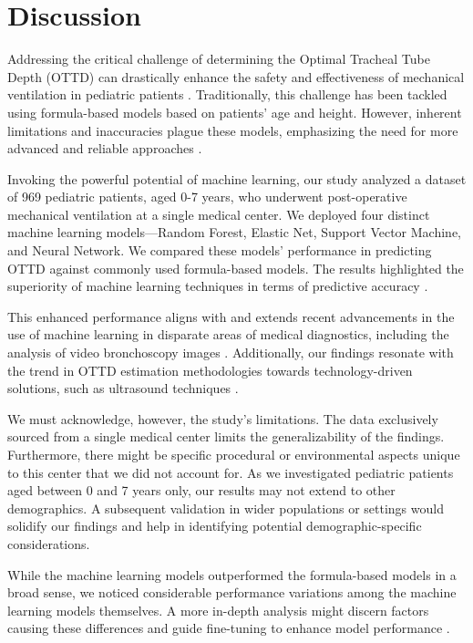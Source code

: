 \documentclass[11pt]{article}
\begin{document}
\section*{Discussion}

Addressing the critical challenge of determining the Optimal Tracheal Tube Depth (OTTD) can drastically enhance the safety and effectiveness of mechanical ventilation in pediatric patients \cite{Weiss2005AppropriatePO}. Traditionally, this challenge has been tackled using formula-based models based on patients' age and height. However, inherent limitations and inaccuracies plague these models, emphasizing the need for more advanced and reliable approaches \cite{Grmec2002ComparisonOT, Tareerath2021AccuracyOA}.

Invoking the powerful potential of machine learning, our study analyzed a dataset of 969 pediatric patients, aged 0-7 years, who underwent post-operative mechanical ventilation at a single medical center. We deployed four distinct machine learning models—Random Forest, Elastic Net, Support Vector Machine, and Neural Network. We compared these models' performance in predicting OTTD against commonly used formula-based models. The results highlighted the superiority of machine learning techniques in terms of predictive accuracy \cite{Simmons-Duffin2017ASD}. 

This enhanced performance aligns with and extends recent advancements in the use of machine learning in disparate areas of medical diagnostics, including the analysis of video bronchoscopy images \cite{Yoo2021DeepLF}. Additionally, our findings resonate with the trend in OTTD estimation methodologies towards technology-driven solutions, such as ultrasound techniques \cite{Lin2016BedsideUF}.

We must acknowledge, however, the study's limitations. The data exclusively sourced from a single medical center limits the generalizability of the findings. Furthermore, there might be specific procedural or environmental aspects unique to this center that we did not account for. As we investigated pediatric patients aged between 0 and 7 years only, our results may not extend to other demographics. A subsequent validation in wider populations or settings would solidify our findings and help in identifying potential demographic-specific considerations.

While the machine learning models outperformed the formula-based models in a broad sense, we noticed considerable performance variations among the machine learning models themselves. A more in-depth analysis might discern factors causing these differences and guide fine-tuning to enhance model performance \cite{Yoo2021DeepLF}.
\end{document}
